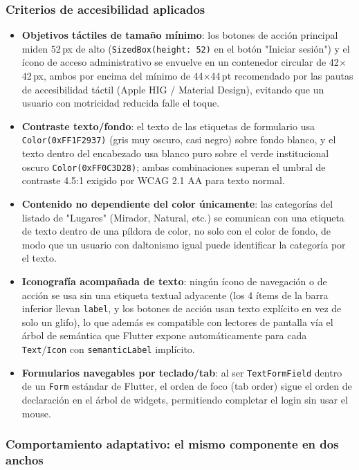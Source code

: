 \subsubsection*{Criterios de accesibilidad aplicados}

\begin{itemize}
\item \textbf{Objetivos táctiles de tamaño mínimo}: los botones de
acción principal miden 52\,px de alto (\texttt{SizedBox(height: 52)} en
el botón "Iniciar sesión") y el ícono de acceso administrativo se
envuelve en un contenedor circular de 42$\times$42\,px, ambos por
encima del mínimo de 44$\times$44\,pt recomendado por las pautas de
accesibilidad táctil (Apple HIG / Material Design), evitando que un
usuario con motricidad reducida falle el toque.
\item \textbf{Contraste texto/fondo}: el texto de las etiquetas de
formulario usa \texttt{Color(0xFF1F2937)} (gris muy oscuro, casi
negro) sobre fondo blanco, y el texto dentro del encabezado usa blanco
puro sobre el verde institucional oscuro \texttt{Color(0xFF0C3D28)};
ambas combinaciones superan el umbral de contraste 4.5:1 exigido por
WCAG 2.1 AA para texto normal.
\item \textbf{Contenido no dependiente del color únicamente}: las
categorías del listado de "Lugares" (Mirador, Natural, etc.) se
comunican con una etiqueta de texto dentro de una píldora de color, no
solo con el color de fondo, de modo que un usuario con daltonismo
igual puede identificar la categoría por el texto.
\item \textbf{Iconografía acompañada de texto}: ningún ícono de
navegación o de acción se usa sin una etiqueta textual adyacente
(los 4 ítems de la barra inferior llevan \texttt{label}, y los botones
de acción usan texto explícito en vez de solo un glifo), lo que además
es compatible con lectores de pantalla vía el árbol de semántica que
Flutter expone automáticamente para cada \texttt{Text}/\texttt{Icon}
con \texttt{semanticLabel} implícito.
\item \textbf{Formularios navegables por teclado/tab}: al ser
\texttt{TextFormField} dentro de un \texttt{Form} estándar de Flutter,
el orden de foco (tab order) sigue el orden de declaración en el árbol
de widgets, permitiendo completar el login sin usar el mouse.
\end{itemize}

\subsubsection*{Comportamiento adaptativo: el mismo componente en dos anchos}


